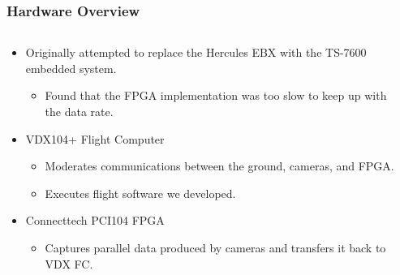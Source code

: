 \documentclass[landscape,xcolor={table}]{beamer}
\begin{document}
	\begin{frame}
		
		\frametitle{Hardware Overview}
		
		\begin{columns}[T] %
		\begin{column}{.68\textwidth}

			\begin{itemize}
				\item Originally attempted to replace the Hercules EBX with the TS-7600 embedded system.
				\begin{itemize}
					\item Found that the FPGA implementation was too slow to keep up with the data rate.
				\end{itemize}
				\item VDX104+ Flight Computer
				\begin{itemize}
					\item Moderates communications between the ground, cameras, and FPGA.
					\item Executes flight software we developed.
				\end{itemize}
				\item Connecttech PCI104 FPGA
				\begin{itemize}
					\item Captures parallel data produced by cameras and transfers it back to VDX FC.
				\end{itemize}
					
			\end{itemize}
		
		\end{column}%
		\hfill%
		\begin{column}{.30\textwidth}


\end{column}
\end{columns}
\end{frame}
\end{document}

